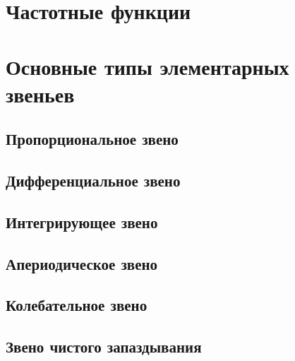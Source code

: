 \documentclass[TAU.tex]{subfiles}
\begin{document}

\section{Частотные функции} %


\section{Основные типы элементарных звеньев} %


\subsection{Пропорциональное звено} %


\subsection{Дифференциальное звено} %


\subsection{Интегрирующее звено} %


\subsection{Апериодическое звено} %


\subsection{Колебательное звено} %


\subsection{Звено чистого запаздывания} %



\end{document}
